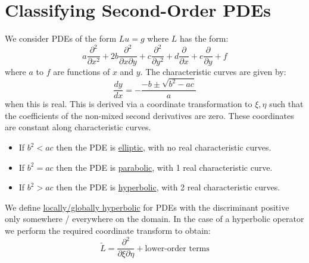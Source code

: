 \documentclass[../Main.tex]{subfiles}
\begin{document}
\section{Classifying Second-Order PDEs}
We consider PDEs of the form $Lu = g$ where $L$ has the form:
\begin{equation*}
    a \frac{\partial^{2}}{\partial x^{2}} + 2b \frac{\partial^{2}}{\partial x\partial y} + c \frac{\partial^{2}}{\partial y^{2}} + d \frac{\partial }{\partial x} + e \frac{\partial }{\partial y} + f
\end{equation*}
where $a$ to $f$ are functions of $x$ and $y$. The characteristic curves are given by:
\begin{equation*}
    \frac{dy}{dx} = - \frac{-b \pm \sqrt{b^2 - ac}}{a}
\end{equation*}
when this is real. This is derived via a coordinate transformation to $\xi, \eta$ such that the coefficients of the non-mixed second derivatives are zero. These coordinates are constant along characteristic curves.
\begin{itemize}
    \item If $b^2 < ac$ then the PDE is \underline{elliptic}, with no real characteristic curves.
    \item If $b^2 = ac$ then the PDE is \underline{parabolic}, with 1 real characteristic curve.
    \item If $b^2 > ac$ then the PDE is \underline{hyperbolic}, with 2 real characteristic curves.
\end{itemize}
We define \underline{locally/globally hyperbolic} for PDEs with the discriminant positive only somewhere / everywhere on the domain.
In the case of a hyperbolic operator we perform the required coordinate transform to obtain:
\begin{equation*}
    \tilde{L} = \frac{\partial^{2}}{\partial \xi\partial \eta} + \text{lower-order terms}
\end{equation*}
\end{document}
